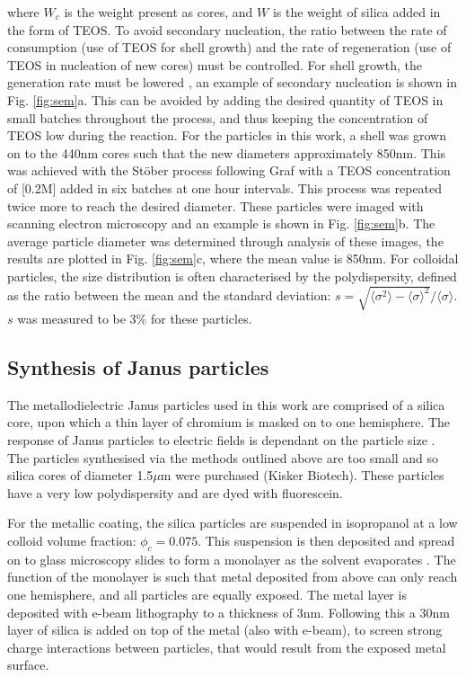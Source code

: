 \noindent where $W_{c}$ is the weight present as cores, and $W$ is the weight of silica added in the form of TEOS.
To avoid secondary nucleation, the ratio between the rate of consumption (use of TEOS for shell growth) and the rate of regeneration (use of TEOS in nucleation of new cores) must be controlled. For shell growth, the generation rate must be lowered \cite{chou2008,bogush1988}, an example of secondary nucleation is shown in Fig. \ref{fig:sem}a. This can be avoided by adding the desired quantity of TEOS in small batches throughout the process, and thus keeping the concentration of TEOS low during the reaction. For the particles in this work, a shell was grown on to the 440nm cores such that the new diameters approximately 850nm. This was achieved with the Stöber process following Graf \etal \cite{graf2003} with a TEOS concentration of [0.2M] added in six batches at one hour intervals. This process was repeated twice more to reach the desired diameter. These particles were imaged with scanning electron microscopy and an example is shown in Fig. \ref{fig:sem}b. The average particle diameter was determined through analysis of these images, the results are plotted in Fig. \ref{fig:sem}c, where the mean value is 850nm. For colloidal particles, the size distribution is often characterised by the polydispersity, defined as the ratio between the mean and the standard deviation: $s = \sqrt{\langle \sigma^2 \rangle - \langle \sigma \rangle^2}/\langle \sigma \rangle$. $s$ was measured to be 3\% for these particles.



\subsection{Synthesis of Janus particles}
\label{sec:janus}
The metallodielectric Janus particles used in this work are comprised of a silica core, upon which a thin layer of chromium is masked on to one hemisphere. The response of Janus particles to electric fields is dependant on the particle size \cite{gangwal2008}. The particles synthesised via the methods outlined above are too small and so silica cores of diameter 1.5$\mu$m were purchased (Kisker Biotech). These particles have a very low polydispersity and are dyed with fluorescein.

For the metallic coating, the silica particles are suspended in isopropanol at a low colloid volume fraction: $\phi_c = 0.075$. This suspension is then deposited and spread on to glass microscopy slides to form a monolayer as the solvent evaporates \cite{jeong2010}. The function of the monolayer is such that metal deposited from above can only reach one hemisphere, and all particles are equally exposed. The metal layer is deposited with e-beam lithography to a thickness of 3nm. Following this a 30nm layer of silica is added on top of the metal (also with e-beam), to screen strong charge interactions between particles, that would result from the exposed metal surface.
 



